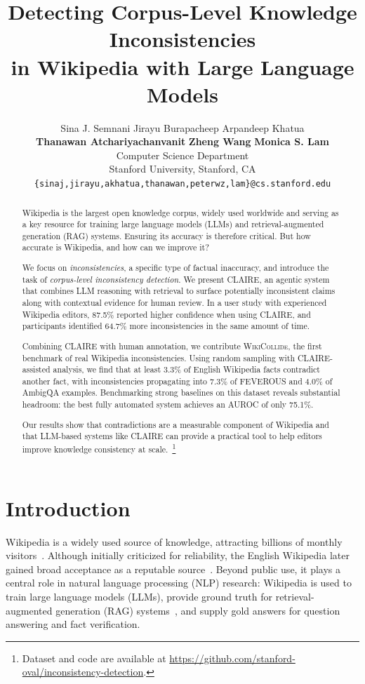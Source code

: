 \documentclass[11pt]{article}
\title{
  Detecting Corpus-Level Knowledge Inconsistencies \\
  in Wikipedia with Large Language Models
}
\author{Sina J. Semnani \quad
  Jirayu Burapacheep \quad
  Arpandeep Khatua \quad \\
  \textbf{Thanawan Atchariyachanvanit} \quad
  \textbf{Zheng Wang} \quad
  \textbf{Monica S. Lam} \\
  Computer Science Department \\
  Stanford University, Stanford, CA \\
  \texttt{\{sinaj,jirayu,akhatua,thanawan,peterwz,lam\}@cs.stanford.edu} \\
}
\newcommand{\dataset}[0]{\textsc{WikiCollide}\xspace}
\newcommand{\system}[0]{\textsc{CLAIRE}\xspace}
\newcommand{\feverous}[0]{\textsc{FEVEROUS}\xspace}
\begin{document}
\maketitle


\begin{abstract}
Wikipedia is the largest open knowledge corpus, widely used worldwide and serving as a key resource for training large language models (LLMs) and retrieval-augmented generation (RAG) systems. Ensuring its accuracy is therefore critical. But how accurate is Wikipedia, and how can we improve it?

We focus on \textit{inconsistencies}, a specific type of factual inaccuracy, and introduce the task of \emph{corpus-level inconsistency detection}. We present \system, an agentic system that combines LLM reasoning with retrieval to surface potentially inconsistent claims along with contextual evidence for human review. In a user study with experienced Wikipedia editors, 87.5\% reported higher confidence when using \system, and participants identified 64.7\% more inconsistencies in the same amount of time.

Combining \system with human annotation, we contribute \dataset, the first benchmark of real Wikipedia inconsistencies. Using random sampling with \system-assisted analysis, we find that at least 3.3\% of English Wikipedia facts contradict another fact, with inconsistencies propagating into 7.3\% of \feverous and 4.0\% of AmbigQA examples. Benchmarking strong baselines on this dataset reveals substantial headroom: the best fully automated system achieves an AUROC of only 75.1\%.

Our results show that contradictions are a measurable component of Wikipedia and that LLM-based systems like \system can provide a practical tool to help editors improve knowledge consistency at scale.~\footnote{Dataset and code are available at \url{https://github.com/stanford-oval/inconsistency-detection}.}
\end{abstract}



\section{Introduction}
\label{sec:introduction}

Wikipedia is a widely used source of knowledge, attracting billions of monthly visitors~\citep{statista_wikipedia_traffic_2024}. Although initially criticized for reliability, the English Wikipedia later gained broad acceptance as a reputable source~\citep{economist_wikipedia_2021}. Beyond public use, it plays a central role in natural language processing (NLP) research: Wikipedia is used to train large language models (LLMs), provide ground truth for retrieval-augmented generation (RAG) systems~\citep{semnani-etal-2023-wikichat, lewis2020retrieval, guu2020realm, zhang-etal-2024-spaghetti}, and supply gold answers for question answering and fact verification.
\end{document}
